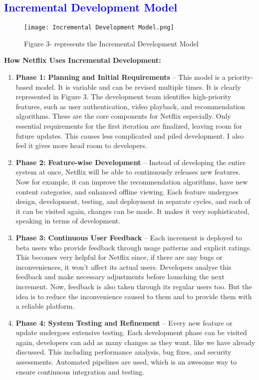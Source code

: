 \documentclass[a4paper,10pt,twoside]{article}
\begin{document}
\subsection{\textcolor{Blue}{Incremental Development Model}}
\begin{figure}[tbhp]
\centering
\texttt{[image: Incremental Development Model.png]}
\caption{Figure 3- represents the Incremental Development Model}
\label{fig:incremental}
\end{figure}
\textbf{How Netflix Uses Incremental Development:}
\begin{enumerate}
    \item \textbf{Phase 1: Planning and Initial Requirements} – This model is a priority-based model. It is variable and can be revised multiple times. It is clearly represented in Figure 3. The development team identifies high-priority features, such as user authentication, video playback, and recommendation algorithms. These are the core components for Netflix especially. Only essential requirements for the first iteration are finalized, leaving room for future updates. This causes less complicated and piled development. I also feel it gives more head room to developers. 
    \item \textbf{Phase 2: Feature-wise Development} – Instead of developing the entire system at once, Netflix will be able to continuously releases new features. Now for example, it can improve the recommendation algorithms, have new content categories, and enhanced offline viewing. Each feature undergoes design, development, testing, and deployment in separate cycles, and each of it can be visited again, changes can be made. It makes it very sophisticated, speaking in terms of development.
    \item \textbf{Phase 3: Continuous User Feedback} – Each increment is deployed to beta users who provide feedback through usage patterns and explicit ratings. This becomes very helpful for Netflix since, if there are any bugs or inconveniences, it won’t affect its actual users. Developers analyse this feedback and make necessary adjustments before launching the next increment. Now, feedback is also taken through its regular users too. But the idea is to reduce the inconvenience caused to them and to provide them with a reliable platform.
    \item \textbf{Phase 4: System Testing and Refinement} – Every new feature or update undergoes extensive testing. Each development phase can be visited again, developers can add as many changes as they want, like we have already discussed. This including performance analysis, bug fixes, and security assessments. Automated pipelines are used, which is an awesome way to ensure continuous integration and testing.
    

\end{enumerate}
\end{document}
